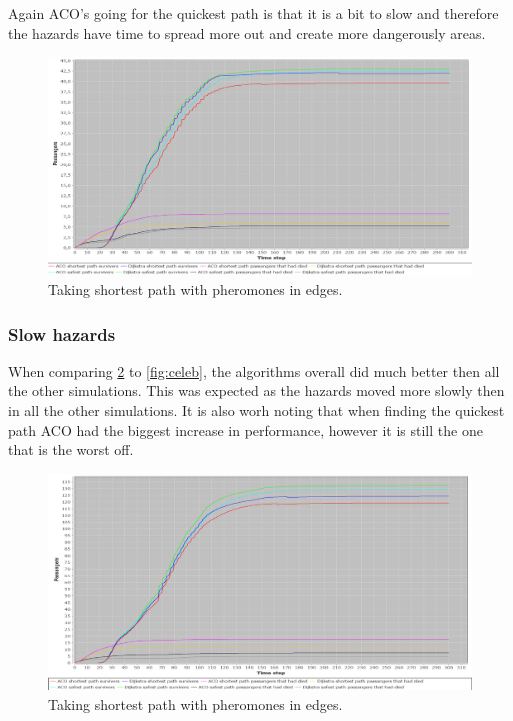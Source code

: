 Again ACO's going for the quickest path is that it is a bit to slow and therefore the hazards have time to spread more out and create more dangerously areas.

\begin{figure} [float]
\centering
\hspace*{-1.0in}
\includegraphics[scale=0.35]{images/Graph-using-200-rounds-50-passangers.png}
\caption{Taking shortest path with pheromones in edges.}
\label{fig:celeb50}
\end{figure}

\subsubsection{Slow hazards}

When comparing \ref{fig:celebSfire} to \ref{fig:celeb}, the algorithms overall did much better then all the other simulations. This was expected as the hazards moved more slowly then in all the other simulations. It is also worh noting that when finding the quickest path ACO had the biggest increase in performance, however it is still the one that is the worst off.

\begin{figure} [float]
\centering
\hspace*{-1.0in}
\includegraphics[scale=0.35]{images/Graph-using-200-rounds-140-passangers-slow-fire.png}
\caption{Taking shortest path with pheromones in edges.}
\label{fig:celebSfire}
\end{figure}
